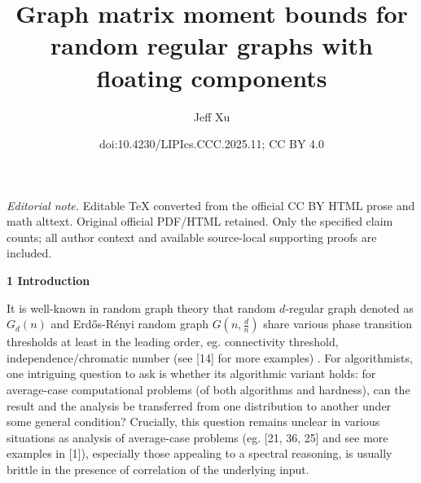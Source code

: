 \documentclass[10pt,a4paper]{article}
\title{Graph matrix moment bounds for random regular graphs with floating components}
\author{Jeff Xu}
\date{doi:10.4230/LIPIcs.CCC.2025.11; CC BY 4.0}
\begin{document}
\maketitle
\noindent\textit{Editorial note.} Editable TeX converted from the official CC BY HTML prose and math alttext. Original official PDF/HTML retained. Only the specified claim counts; all author context and available source-local supporting proofs are included.\par\medskip


\par\medskip\noindent\textbf{
1 Introduction}\par




It is well-known in random graph theory that random $d$-regular graph denoted as $G_{d}(n)$ and Erdős-Rényi random graph $G(n,\frac{d}{n})$ share various phase transition thresholds at least in the leading order, eg. connectivity threshold, independence/chromatic number (see [14] for more examples) . For algorithmists,
one intriguing question to ask is whether its algorithmic variant holds: for average-case computational problems (of both algorithms and hardness),
can the result and the analysis be transferred from one distribution to another under some general condition?
Crucially, this question remains unclear in various situations as analysis of average-case problems (eg. [21, 36, 25] and see more examples in [1]), especially those appealing to a spectral reasoning, is usually brittle in the presence of correlation of the underlying input.\par
\end{document}
